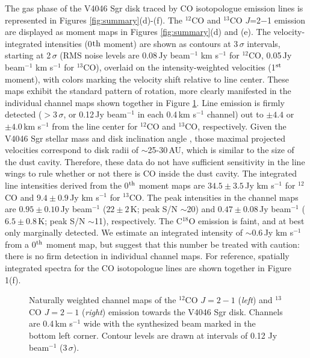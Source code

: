 {The gas phase of the V4046 Sgr disk traced by CO isotopologue emission lines is
represented in Figures \ref{fig:summary}(d)-(f).  The $^{12}$CO and $^{13}$CO 
$J$=2$-$1 emission are displayed as moment maps in Figures \ref{fig:summary}(d) 
and (e).  The velocity-integrated intensities (0${\rm th}$ moment) are shown as 
contours at 3\,$\sigma$ intervals, starting at 2\,$\sigma$ (RMS noise levels 
are 0.08\,Jy beam$^{-1}$ km s$^{-1}$ for $^{12}$CO, 0.05\,Jy beam$^{-1}$ km 
s$^{-1}$ for $^{13}$CO), overlaid on the intensity-weighted velocities (1$^{\rm 
st}$ moment), with colors marking the velocity shift relative to line center.  
These maps exhibit the standard pattern of rotation, more clearly manifested in 
the individual channel maps shown together in Figure \ref{fig:chmaps}.  Line 
emission is firmly detected ($>$3\,$\sigma$, or 0.12\,Jy beam$^{-1}$ in each 
0.4\,km s$^{-1}$ channel) out to $\pm4.4$ or $\pm4.0$\,km s$^{-1}$ from the 
line center for $^{12}$CO and $^{13}$CO, respectively.  Given the V4046 Sgr 
stellar mass and disk inclination angle \citep[$i = 33\fdg5$, PA$ = 76$\degr 
with an ambiguity in the absolute orientation;][]{rosenfeld12}, those maximal 
projected velocities correspond to disk radii of $\sim$25-30\,AU, which is 
similar to the size of the dust cavity.  Therefore, these data do not have 
sufficient sensitivity in the line wings to rule whether or not there is 
CO inside the dust cavity.  The integrated line intensities derived from the 
0$^{\rm th}$ moment maps are $34.5\pm3.5$\,Jy km s$^{-1}$ for $^{12}$CO and 
$9.4\pm0.9$\,Jy km s$^{-1}$ for $^{13}$CO.  The peak intensities in the channel 
maps are $0.95\pm0.10$\,Jy beam$^{-1}$ ($22\pm 2$\,K; peak S/N $\sim$20) and 
$0.47\pm0.08$\,Jy beam$^{-1}$ ($6.5\pm0.8$\,K; peak S/N $\sim$11), respectively.
The C$^{18}$O emission is faint, and at best only marginally detected.  We 
estimate an integrated intensity of $\sim$0.6\,Jy km s$^{-1}$ from a 
0$^{\rm th}$ moment map, but suggest that this number be treated with caution: 
there is no firm detection in individual channel maps.  For reference, spatially
integrated spectra for the CO isotopologue lines are shown together in Figure 
1(f).

\begin{figure}[t!]
\caption{Naturally weighted channel maps of the $^{12}$CO $J=2-1$ 
({\it left}) and $^{13}$CO $J=2-1$ ({\it right}) emission towards the V4046 
Sgr disk.  Channels are 0.4\,km s$^{-1}$ wide with the synthesized beam 
marked in the bottom left corner.  Contour levels are drawn at intervals of 
0.12 Jy\,beam$^{-1}$ ($3\,\sigma$).
\label{fig:chmaps}}
\end{figure}

}
